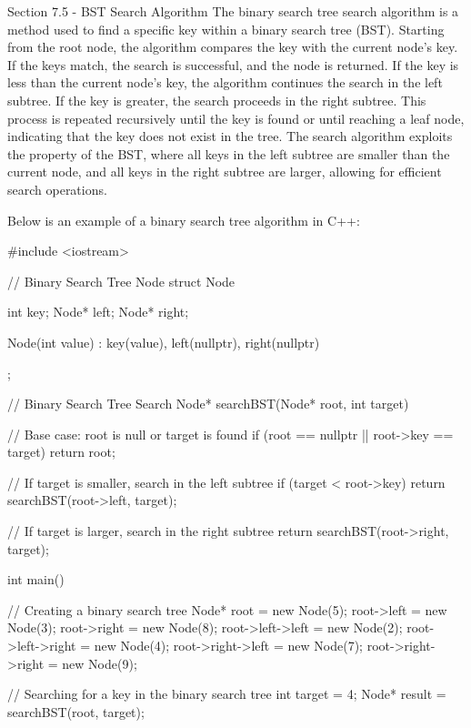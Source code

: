 \begin{notes}{Section 7.5 - BST Search Algorithm}
    The binary search tree search algorithm is a method used to find a specific key within a binary search tree (BST). Starting from the root node, the algorithm compares the key with the current node's key. If the keys match, the search is successful, and the node is returned. If the key is less than the current node's key, the algorithm continues 
    the search in the left subtree. If the key is greater, the search proceeds in the right subtree. This process is repeated recursively until the key is found or until reaching a leaf node, indicating that the key does not exist in the tree. The search algorithm exploits the property of the BST, where all keys in the left subtree are smaller 
    than the current node, and all keys in the right subtree are larger, allowing for efficient search operations.
    
    \begin{highlight}
        Below is an example of a binary search tree algorithm in C++:
    
    \begin{code}[C++]
    #include <iostream>

    // Binary Search Tree Node
    struct Node {
        int key;
        Node* left;
        Node* right;
    
        Node(int value) : key(value), left(nullptr), right(nullptr) {}
    };
    
    // Binary Search Tree Search
    Node* searchBST(Node* root, int target) {
        // Base case: root is null or target is found
        if (root == nullptr || root->key == target)
            return root;
    
        // If target is smaller, search in the left subtree
        if (target < root->key)
            return searchBST(root->left, target);
        
        // If target is larger, search in the right subtree
        return searchBST(root->right, target);
    }
    
    int main() {
        // Creating a binary search tree
        Node* root = new Node(5);
        root->left = new Node(3);
        root->right = new Node(8);
        root->left->left = new Node(2);
        root->left->right = new Node(4);
        root->right->left = new Node(7);
        root->right->right = new Node(9);
    
        // Searching for a key in the binary search tree
        int target = 4;
        Node* result = searchBST(root, target);
    
}
\end{code}
\end{highlight}
\end{notes}
